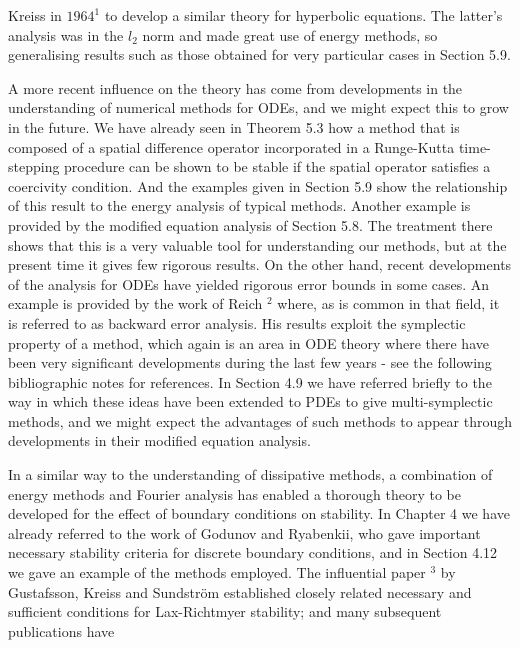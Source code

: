 \documentclass[10pt]{article}
\begin{document}
Kreiss in \(1964^{1}\) to develop a similar theory for hyperbolic equations. The latter's analysis was in the \(l_{2}\) norm and made great use of energy methods, so generalising results such as those obtained for very particular cases in Section 5.9.

A more recent influence on the theory has come from developments in the understanding of numerical methods for ODEs, and we might expect this to grow in the future. We have already seen in Theorem 5.3 how a method that is composed of a spatial difference operator incorporated in a Runge-Kutta time-stepping procedure can be shown to be stable if the spatial operator satisfies a coercivity condition. And the examples given in Section 5.9 show the relationship of this result to the energy analysis of typical methods. Another example is provided by the modified equation analysis of Section 5.8. The treatment there shows that this is a very valuable tool for understanding our methods, but at the present time it gives few rigorous results. On the other hand, recent developments of the analysis for ODEs have yielded rigorous error bounds in some cases. An example is provided by the work of Reich \({ }^{2}\) where, as is common in that field, it is referred to as backward error analysis. His results exploit the symplectic property of a method, which again is an area in ODE theory where there have been very significant developments during the last few years - see the following bibliographic notes for references. In Section 4.9 we have referred briefly to the way in which these ideas have been extended to PDEs to give multi-symplectic methods, and we might expect the advantages of such methods to appear through developments in their modified equation analysis.

In a similar way to the understanding of dissipative methods, a combination of energy methods and Fourier analysis has enabled a thorough theory to be developed for the effect of boundary conditions on stability. In Chapter 4 we have already referred to the work of Godunov and Ryabenkii, who gave important necessary stability criteria for discrete boundary conditions, and in Section 4.12 we gave an example of the methods employed. The influential paper \({ }^{3}\) by Gustafsson, Kreiss and Sundström established closely related necessary and sufficient conditions for Lax-Richtmyer stability; and many subsequent publications have
\end{document}
